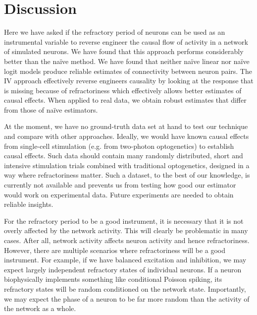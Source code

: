 \documentclass[11pt]{article}
\begin{document}
\section{Discussion}
Here we have asked if the refractory period of neurons can be used as an instrumental variable to reverse engineer the causal flow of activity in a network of simulated neurons. 
We have found that this approach performs considerably better than the na\"ive method. 
We have found that neither na\"ive linear nor na\"ive logit models produce reliable estimates of connectivity between neuron pairs. 
The IV approach effectively reverse engineers causality by looking at the response that is missing because of refractoriness which effectively allows better estimates of causal effects. When applied to real data, we obtain robust estimates that differ from those of na\"ive estimators.

At the moment, we have no ground-truth data set at hand to test our technique and compare with other approaches. 
Ideally, we would have known causal effects from single-cell stimulation (e.g. from two-photon optogenetics) to establish causal effects. 
Such data should contain many randomly distributed, short and intensive stimulation trials combined with traditional optogenetics, designed in a way where refractoriness matter. 
Such a dataset, to the best of our knowledge, is currently not available and prevents us from testing how good our estimator would work on experimental data. 
Future experiments are needed to obtain reliable insights. 

For the refractory period to be a good instrument, it is necessary that it is not overly affected by the network activity. 
This will clearly be problematic in many cases. 
After all, network activity affects neuron activity and hence refractoriness. 
However, there are multiple scenarios where refractoriness will be a good instrument. 
For example, if we have balanced excitation and inhibition, we may expect largely independent refractory states of individual neurons. 
If a neuron biophysically implements something like conditional Poisson spiking, its refractory states will be random conditioned on the network state. 
Importantly, we may expect the phase of a neuron to be far more random than the activity of the network as a whole.
\end{document}
